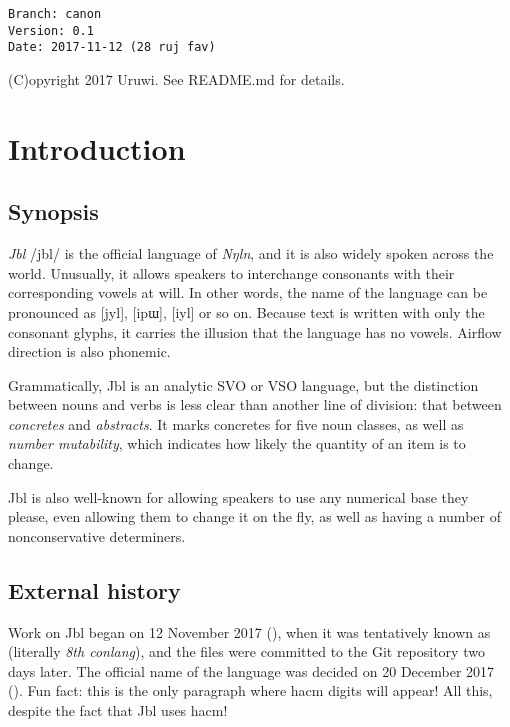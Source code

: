 \documentclass{book}
\newcommand{\lname}{Jbl}
\begin{document}
\begin{verbatim}
Branch: canon
Version: 0.1
Date: 2017-11-12 (28 ruj fav)
\end{verbatim}

(C)opyright 2017 Uruwi. See README.md for details.

\tableofcontents

\section{Introduction}

\subsection{Synopsis}

\emph{\lname} /jbl/ is the official language of \emph{Nŋln}, and it is also widely spoken across the world. Unusually, it allows speakers to interchange consonants with their corresponding vowels at will. In other words, the name of the language can be pronounced as [jyl], [ipɯ], [iyl] or so on. Because text is written with only the consonant glyphs, it carries the illusion that the language has no vowels. Airflow direction is also phonemic.

Grammatically, \lname{} is an analytic SVO or VSO language, but the distinction between nouns and verbs is less clear than another line of division: that between \emph{concretes} and \emph{abstracts}. It marks concretes for five noun classes, as well as \emph{number mutability}, which indicates how likely the quantity of an item is to change.

\lname{} is also well-known for allowing speakers to use any numerical base they please, even allowing them to change it on the fly, as well as having a number of nonconservative determiners.

\subsection{External history}

Work on \lname{} began on 12 November 2017 (), when it was tentatively known as  (literally \emph{8th conlang}), and the files were committed to the Git repository two days later. The official name of the language was decided on 20 December 2017 (). Fun fact: this is the only paragraph where hacm digits will appear! All this, despite the fact that \lname{} uses hacm!
\end{document}

